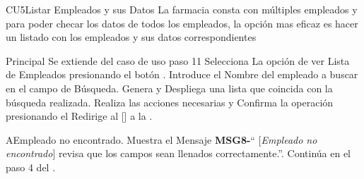 \begin{UseCase}{CU5}{Listar Empleados y sus Datos}{
		La farmacia consta con múltiples empleados y para poder checar los datos de todos los empleados, la opción mas eficaz es hacer un listado con los empleados y sus datos correspondientes
	}
	\end{UseCase}
	\begin{UCtrayectoria}{Principal}
		\UCpaso Se extiende del caso de uso  paso 11
		\UCpaso[\UCactor] Selecciona La opción de ver Lista de  Empleados presionando el botón .
		\UCpaso[\UCactor] Introduce el Nombre del empleado a buscar en el campo de Búsqueda.
		\UCpaso Genera y Despliega una lista que coincida con la búsqueda realizada.  
		\UCpaso [\UCactor]Realiza las acciones necesarias y  Confirma la operación presionando el 
		\UCpaso Redirige al [\UCactor] a la  .
	\end{UCtrayectoria}


\begin{UCtrayectoriaA}{A}{Empleado no encontrado.}
			\UCpaso Muestra el Mensaje {\bf MSG8-}`` [{\em Empleado no encontrado}] revisa que los campos sean llenados correctamente.''.
			\UCpaso Continúa en el paso 4 del .
		\end{UCtrayectoriaA}
